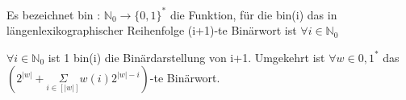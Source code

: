     Es bezeichnet bin : \(\mathbb{N}_{0} \rightarrow \{0, 1\}^{*}\) die Funktion, für die bin(i) das in längenlexikographischer Reihenfolge (i+1)-te Binärwort ist \(\forall i \in \mathbb{N}_{0}\)

    \(\forall i \in \mathbb{N}_{0}\) ist 1 bin(i) die Binärdarstellung von i+1. Umgekehrt ist \(\forall w \in {0, 1}^{*}\) das \((2^{|w|} + \underset{i \in [|w|]}{\Sigma} w(i) 2^{|w|-i})\)-te Binärwort.
